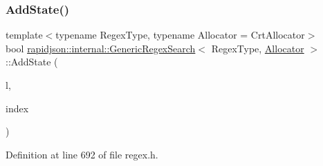 \subsubsection{\texorpdfstring{AddState()}{AddState()}}
{\footnotesize\ttfamily template$<$typename Regex\+Type, typename Allocator = Crt\+Allocator$>$ \\
bool \mbox{\hyperlink{classrapidjson_1_1internal_1_1_generic_regex_search}{rapidjson\+::internal\+::\+Generic\+Regex\+Search}}$<$ Regex\+Type, \mbox{\hyperlink{classrapidjson_1_1_allocator}{Allocator}} $>$\+::Add\+State (\begin{DoxyParamCaption}\item[{\mbox{\hyperlink{classrapidjson_1_1internal_1_1_stack}{Stack}}$<$ \mbox{\hyperlink{classrapidjson_1_1_allocator}{Allocator}} $>$ \&}]{l,  }\item[{\mbox{\hyperlink{namespacerapidjson_a44eb33eaa523e36d466b1ced64b85c84}{Size\+Type}}}]{index }\end{DoxyParamCaption})\hspace{0.3cm}{\ttfamily [private]}}



Definition at line 692 of file regex.\+h.


